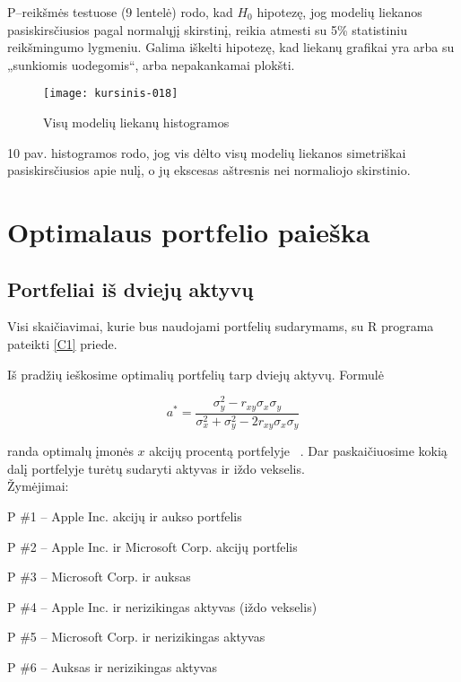 \documentclass[12pt, a14paper, lithuanian]{article}
\begin{document}
P--reikšmės testuose (9 lentelė) rodo, kad $H_0$ hipotezę, jog modelių liekanos pasiskirsčiusios pagal normalųjį skirstinį, reikia atmesti su 5\% statistiniu reikšmingumo lygmeniu. Galima iškelti hipotezę, kad liekanų grafikai yra arba su „sunkiomis uodegomis“, arba nepakankamai plokšti. 

\begin{figure}[H]
  \centering
\texttt{[image: kursinis-018]}
  \caption{Visų modelių liekanų histogramos}
  \label{fig:10}
\end{figure}

10 pav. histogramos rodo, jog vis dėlto visų modelių liekanos simetriškai pasiskirsčiusios apie nulį, o jų ekscesas aštresnis nei normaliojo skirstinio.




\newpage
\section{Optimalaus portfelio paieška}   


\subsection{Portfeliai iš dviejų aktyvų}

Visi skaičiavimai, kurie bus naudojami portfelių sudarymams, su R programa pateikti \ref{C1} priede.
 
Iš pradžių ieškosime optimalių portfelių tarp dviejų aktyvų. Formulė

\begin{equation}
a^{\ast}= \frac{\sigma_y^2 - r_{xy}\sigma_x \sigma_y}{\sigma^2_x + \sigma^2_y - 2r_{xy}\sigma_x \sigma_y} \label{form}
\end{equation}

randa optimalų įmonės $x$ akcijų procentą portfelyje ~\cite{cope}. Dar paskaičiuosime kokią dalį portfelyje turėtų sudaryti aktyvas ir iždo vekselis. \\

Žymėjimai:

P \#1 -- Apple Inc. akcijų ir aukso portfelis

P \#2 -- Apple Inc. ir Microsoft Corp. akcijų portfelis

P \#3 -- Microsoft Corp. ir auksas

P \#4 -- Apple Inc. ir nerizikingas aktyvas (iždo vekselis)

P \#5 -- Microsoft Corp. ir nerizikingas aktyvas

P \#6 -- Auksas ir nerizikingas aktyvas
\end{document}
